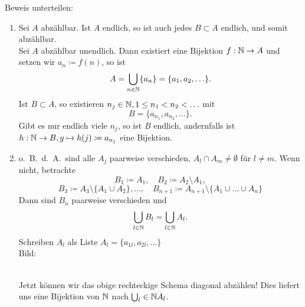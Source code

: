 \documentclass[../ana1.tex]{subfiles}
\begin{document}
\begin{bew}
	Beweis unterteilen:
	\begin{enumerate}
		\item Sei \(A \) abzählbar. Ist \(A \) endlich, so ist auch jedes \(B\subset A \) endlich, und somit abzählbar. \\
		      Sei \(A \) abzählbar unendlich. Dann existiert eine Bijektion \(f: \mathbb{N} \rightarrow A \) und setzen wir \(a_n \coloneqq f(n) \), so ist
		      \[ A = \bigcup_{n\in\mathbb{N}} \{a_n\} = \{a_1, a_2,\ldots \}. \]
			  Ist \(B\subset A \), so existieren \(n_j \in\mathbb{N}, 1\leq n_1<n_2<\ldots \) mit 
			  \[ B = \{a_{n_1}, a_{n_2}, \ldots \}. \]
		      Gibt es nur endlich viele \(n_j \), so ist \(B \) endlich, andernfalls ist \(h: \mathbb{N} \rightarrow B, g \mapsto h(j) \coloneqq a_{n_j} \)
		      eine Bijektion.
		\item o.\ B.\ d.\ A.\ sind alle \(A_j \) paarweise verschieden, \(A_l \cap A_m \neq \emptyset \) für \(l\neq m \).
		      Wenn nicht, betrachte
		      \[ B_1 \coloneqq A_1, \quad B_2 \coloneqq A_2 \setminus A_1, \]
		      \[ B_3 \coloneqq A_3 \setminus \{A_1 \cup A_2\}, \ldots, \quad B_{n+1} \coloneqq A_{n+1} \setminus \{A_1\cup\ldots\cup A_n\} \]
		      Dann sind \(B_n \) paarweise verschieden und \[\bigcup_{l\in\mathbb{N}} B_l = \bigcup_{l\in\mathbb{N}} A_l. \]
		      Schreiben \(A_l \) als Liste \(A_l = \{a_{1l}, a_{2l}, \ldots \} \) \\
		      Bild: \\
		      \\Jetzt können wir das obige rechteckige Schema diagonal abzählen! Dies liefert uns eine Bijektion von \(\mathbb{N} \) nach \(\bigcup_l\in\mathbb{N} A_l \).
	\end{enumerate}
\end{bew}
\end{document}
